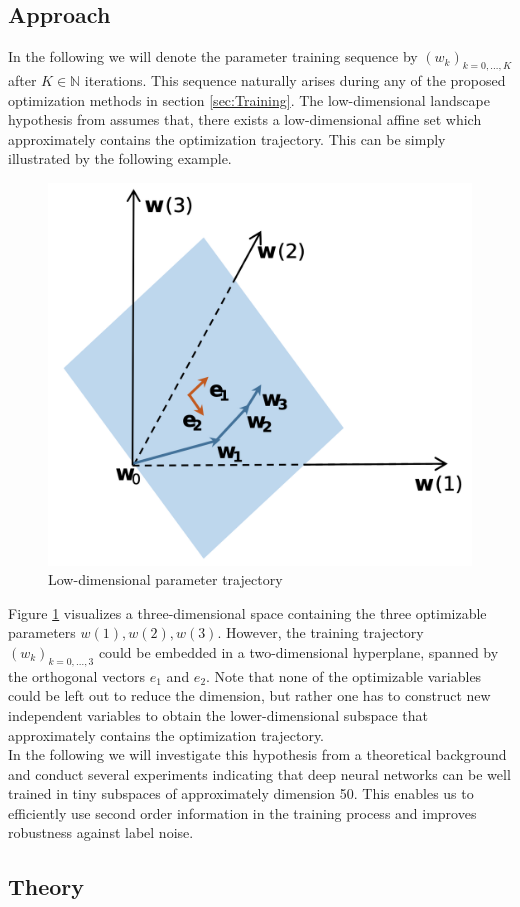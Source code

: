 \documentclass[11pt, a4paper]{article}
\newcommand{\N}{\mathbb{N}}
\begin{document}
\subsection{Approach}

In the following we will denote the parameter training sequence by $(w_k)_{k=0, \dots, K}$ after $K \in \N$ iterations. This sequence naturally arises during any of the proposed optimization methods in section \ref{sec:Training}. The low-dimensional landscape hypothesis from \cite{Paper} assumes that, there exists a low-dimensional affine set which approximately contains the optimization trajectory. This can be simply illustrated by the following example.

\begin{figure}[!h]
\centering
\includegraphics[width=0.45\linewidth]{images/trajectory.png}
\caption{Low-dimensional parameter trajectory}
\label{fig:trajectory}
\end{figure}  

Figure \ref{fig:trajectory} visualizes a three-dimensional space containing the three optimizable parameters $w(1), w(2), w(3)$. However, the training trajectory $(w_k)_{k=0, \dots, 3}$ could be embedded in a two-dimensional hyperplane, spanned by the orthogonal vectors $e_1$ and $e_2$. Note that none of the optimizable variables could be left out to reduce the dimension, but rather one has to construct new independent variables to obtain the lower-dimensional subspace that approximately contains the optimization trajectory. \\

In the following we will investigate this hypothesis from a theoretical background and conduct several experiments indicating that deep neural networks can be well trained in tiny subspaces of approximately dimension 50. This enables us to efficiently use second order information in the training process and improves robustness against label noise. 

\subsection{Theory}
\end{document}
